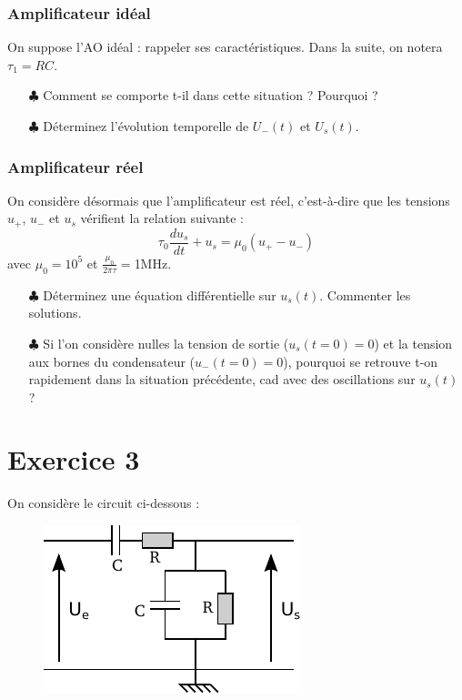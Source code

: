 \documentclass{report}
\begin{document}
\subsubsection{Amplificateur idéal}

On suppose l'AO idéal : rappeler ses caractéristiques. Dans la suite, on notera $\tau_1=RC$.

\begin{itemize}
	\item[$\clubsuit$] Comment se comporte t-il dans cette situation ? Pourquoi ?
	\item[$\clubsuit$] Déterminez l'évolution temporelle de  $U_{-}(t)$ et $U_{s}(t)$. 
\end{itemize}

\subsubsection{Amplificateur réel}

On considère désormais que l'amplificateur est réel, c'est-à-dire que les tensions $u_+$, $u_-$ et $u_s$ vérifient la relation suivante : 
	\begin{equation}
		\tau_0\frac{du_s}{dt} +u_s = \mu_0(u_+-u_-)
	\end{equation}
	avec $\mu_0=10^5$ et $\frac{\mu_0}{2\pi\tau}=$1MHz.
\begin{itemize}
	\item[$\clubsuit$] Déterminez une équation différentielle sur $u_s(t)$. Commenter les solutions. 
	\item[$\clubsuit$] Si l'on considère nulles la tension de sortie ($u_s(t=0)=0$) et la tension aux bornes du condensateur  ($u_-(t=0)=0$), pourquoi se retrouve t-on rapidement dans la situation précédente, cad avec des oscillations sur $u_s(t)$ ?
\end{itemize}


\newpage

\section*{Exercice 3}

On considère le circuit ci-dessous :

\begin{figure}[!h]
\centering
\includegraphics[width=0.5\linewidth]{circuit_1.pdf}
\end{figure}
\end{document}
